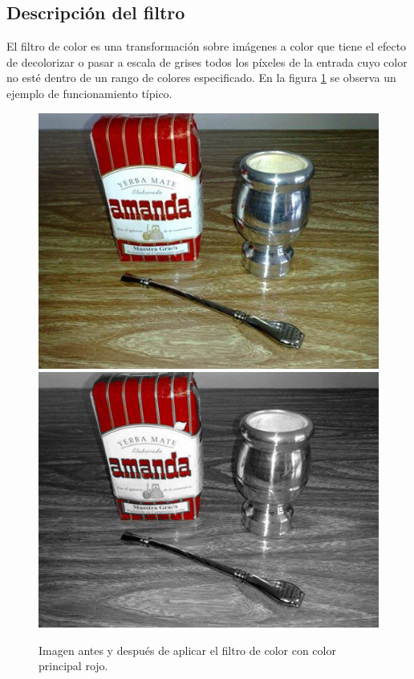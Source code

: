\subsection{Descripción del filtro}

El filtro de color es una transformación sobre imágenes a color que tiene el efecto de decolorizar o pasar a escala de grises todos los píxeles de la entrada cuyo color no esté dentro de un rango de colores especificado. En la figura \ref{fig:filtro-color-ejemplo} se observa un ejemplo de funcionamiento típico.

\begin{figure}[h]
\begin{center}
  \includegraphics[scale=0.4]{secciones/filtro_color/imagenes/matecocido.jpg}
  \includegraphics[scale=0.4]{secciones/filtro_color/imagenes/matecocido-fcolor.jpg}
\end{center}
\caption{Imagen antes y después de aplicar el filtro de color con color principal rojo.}
\label{fig:filtro-color-ejemplo}
\end{figure}

